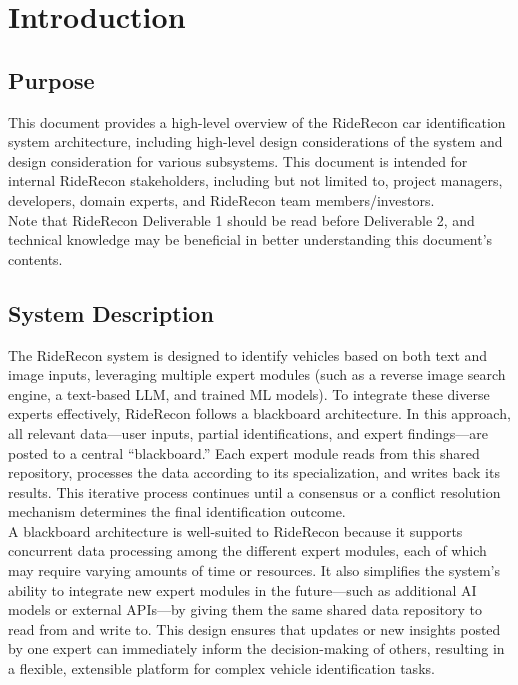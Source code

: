 \documentclass[]{article}
\begin{document}
\newpage
\section{Introduction}
\label{sec:introduction}

\subsection{Purpose}
\label{sub:purpose}
This document provides a high-level overview of the RideRecon car identification system architecture, including high-level design considerations of the system and design consideration for various subsystems. This document is intended for internal RideRecon stakeholders, including but not limited to, project managers, developers, domain experts, and RideRecon team members/investors. \\

\noindent Note that RideRecon Deliverable 1 should be read before Deliverable 2, and technical knowledge may be beneficial in better understanding this document's contents.


\subsection{System Description}
\label{sub:system_description}
The RideRecon system is designed to identify vehicles based on both text and image inputs, leveraging multiple expert modules (such as a reverse image search engine, a text-based LLM, and trained ML models). To integrate these diverse experts effectively, RideRecon follows a blackboard architecture. In this approach, all relevant data—user inputs, partial identifications, and expert findings—are posted to a central “blackboard.” Each expert module reads from this shared repository, processes the data according to its specialization, and writes back its results. This iterative process continues until a consensus or a conflict resolution mechanism determines the final identification outcome.\\

\noindent A blackboard architecture is well-suited to RideRecon because it supports concurrent data processing among the different expert modules, each of which may require varying amounts of time or resources. It also simplifies the system’s ability to integrate new expert modules in the future—such as additional AI models or external APIs—by giving them the same shared data repository to read from and write to. This design ensures that updates or new insights posted by one expert can immediately inform the decision-making of others, resulting in a flexible, extensible platform for complex vehicle identification tasks.
\end{document}
